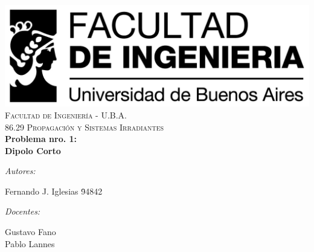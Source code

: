 \begin{titlepage}

\begin{center}


\includegraphics[scale=1]{img/fiuba.png} \\[1cm] 

\textsc{\LARGE Facultad de Ingeniería - U.B.A.}\\[1.5cm]

\textsc{\Large 86.29 Propagación y Sistemas Irradiantes}\\[2cm]


{ \huge \bfseries Problema nro. 1:}\\
{ \huge \bfseries Dipolo Corto}\\[3cm]


\begin{flushleft} \large
\emph{Autores:}\\[.2cm]
\end{flushleft}
\begin{tabbing}
Fernando J. Iglesias \hspace{4cm}\= 94842\\
\end{tabbing}

\begin{flushleft} \large
\emph{Docentes:}\\[.2cm]
\end{flushleft}
Gustavo Fano\\
Pablo Lannes\\[.5cm]


\vfill


\end{center}

\end{titlepage}